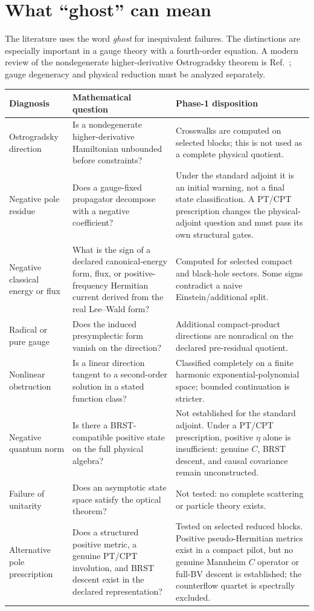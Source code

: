 \documentclass[11pt]{article}
\begin{document}
\clearpage
\section{What ``ghost'' can mean}

The literature uses the word \emph{ghost} for inequivalent failures.  The
distinctions are especially important in a gauge theory with a fourth-order
equation.  A modern review of the nondegenerate higher-derivative
Ostrogradsky theorem is Ref.~\cite{Woodard}; gauge degeneracy and physical
reduction must be analyzed separately.

\begin{longtable}{@{}p{}p{}p{}@{}}
\toprule
Diagnosis & Mathematical question & Phase-1 disposition \\
\midrule
\endhead
Ostrogradsky direction & Is a nondegenerate higher-derivative Hamiltonian
unbounded before constraints? & Crosswalks are computed on selected blocks;
this is not used as a complete physical quotient. \\
Negative pole residue & Does a gauge-fixed propagator decompose with a
negative coefficient? & Under the standard adjoint it is an initial warning,
not a final state classification.  A PT/CPT prescription changes the
physical-adjoint question and must pass its own structural gates. \\
Negative classical energy or flux & What is the sign of a declared
canonical-energy form, flux, or positive-frequency Hermitian current derived
from the real Lee--Wald form? & Computed for selected
compact and black-hole sectors.  Some signs contradict a naive
Einstein/additional split. \\
Radical or pure gauge & Does the induced presymplectic form vanish on the
direction? & Additional compact-product directions are nonradical on the
declared pre-residual quotient. \\
Nonlinear obstruction & Is a linear direction tangent to a second-order
solution in a stated function class? & Classified completely on a finite
harmonic exponential-polynomial space; bounded continuation is stricter. \\
Negative quantum norm & Is there a BRST-compatible positive state on the
full physical algebra? & Not established for the standard adjoint.  Under a
PT/CPT prescription, positive $\eta$ alone is insufficient: genuine $C$,
BRST descent, and causal covariance remain unconstructed. \\
Failure of unitarity & Does an asymptotic state space satisfy the optical
theorem? & Not tested: no complete scattering or particle theory exists. \\
Alternative pole prescription & Does a structured positive metric, a genuine
PT/CPT involution, and BRST descent exist in the declared representation? &
Tested on selected reduced blocks.  Positive pseudo-Hermitian metrics exist
in a compact pilot, but no genuine Mannheim $C$ operator or full-BV descent is
established; the counterflow quartet is spectrally excluded. \\
\bottomrule
\end{longtable}
\end{document}
